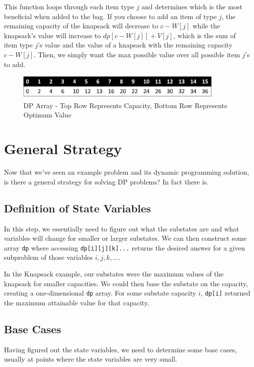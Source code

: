 This function loops through each item type $j$ and determines which is the most beneficial when added to the bag.  If you choose to add an item of type $j$, the remaining capacity of the knapsack will decrease to $c - W[j]$ while the knapsack's value will increase to $dp[c - W[j]] + V[j]$, which is the sum of item type $j$'s value and the value of a knapsack with the remaining capacity $c - W[j]$.  Then, we simply want the max possible value over all possible item $j$'s to add.
%
\begin{figure}[h]
\begin{center}
\includegraphics[width=4in]{images/knapsack2.png}
\end{center}
\caption{DP Array - Top Row Represents Capacity, Bottom Row Represents Optimum Value}
\end{figure}

\section{General Strategy}
Now that we've seen an example problem and its dynamic programming solution, is there a general strategy for solving DP problems?  In fact there is.
%
\subsection{Definition of State Variables}
In this step, we essentially need to figure out what the substates are and what variables will change for smaller or larger substates.  We can then construct some array \verb=dp= where accessing \verb=dp[i][j][k]...= returns the desired answer for a given subproblem of those variables $i, j, k, \ldots$.

In the Knapsack example, our substates were the maximum values of the knapsack for smaller capacities.  We could then base the substate on the capacity, creating a one-dimensional \verb=dp= array.  For some substate capacity $i$, \verb=dp[i]= returned the maximum attainable value for that capacity.
%
\subsection{Base Cases}
Having figured out the state variables, we need to determine some base cases, usually at points where the state variables are very small.

